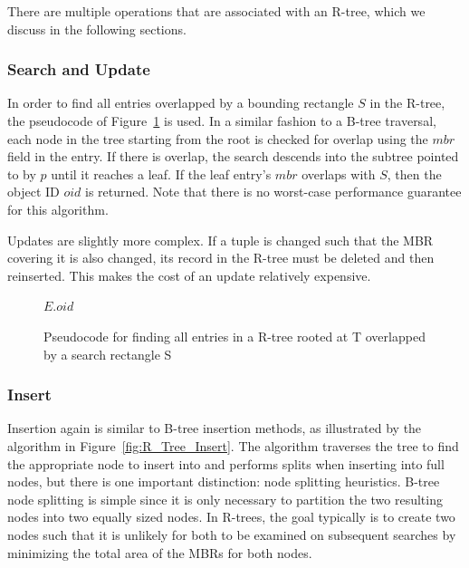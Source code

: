 There are multiple operations that are associated with an R-tree, which we 
discuss in the following sections.

\subsubsection{Search and Update}
In order to find all entries overlapped by a bounding rectangle $S$ in the 
R-tree, the pseudocode of Figure~\ref{fig:R_Tree_Search} is used. In a similar 
fashion to a B-tree traversal, each node in the tree starting from the root is 
checked for overlap using the $mbr$ field in the entry. If there is overlap, 
the search descends into the subtree pointed to by $p$ until it reaches a leaf. 
If the leaf entry's $mbr$ overlaps with $S$, then the object ID $oid$ is 
returned. Note that there is no worst-case performance guarantee for this
algorithm.

Updates are slightly more complex. If a tuple is changed such that the MBR
covering it is also changed, its record in the R-tree must be deleted and then
reinserted. This makes the cost of an update relatively expensive.

\begin{figure}[t]
\begin{algorithmic}
					\State {}
				\EndIf
			\EndFor
		\Else
					\Return $E.oid$
				\EndIf
			\EndFor
		\EndIf
	\EndFunction
\end{algorithmic}
\caption{Pseudocode for finding all entries in a R-tree rooted at T overlapped 
	by a search rectangle S}
\label{fig:R_Tree_Search}
\end{figure}

\subsubsection{Insert}
Insertion again is similar to B-tree insertion methods, as illustrated by the 
algorithm in Figure~\ref{fig:R_Tree_Insert}. The algorithm traverses the tree 
to find the appropriate node to insert into and performs splits when inserting
into full nodes, but there is one important distinction: node splitting 
heuristics. B-tree node splitting is simple since it is only necessary to 
partition the two resulting nodes into two equally sized nodes. In R-trees, the 
goal typically is to create two nodes such that it is unlikely for both to be
examined on subsequent searches by minimizing the total area of the MBRs for
both nodes.

